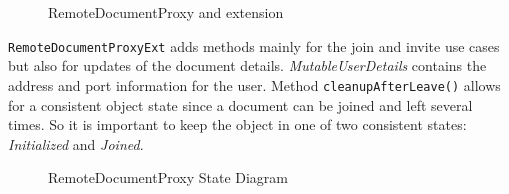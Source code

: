 \begin{figure}[H]
 \centering
 \caption{RemoteDocumentProxy and extension}
 \label{fig:network.discovery.remotedocumentproxy.uml}
\end{figure}

 \texttt{RemoteDocumentProxyExt} adds methods mainly for the join and invite use cases but also for updates of the document details. \emph{MutableUserDetails} contains the address and port information for the user. Method  \texttt{cleanupAfterLeave()} allows for a consistent object state since a document can be joined and left several times. So it is important to keep the object in one of two consistent states: \emph{Initialized} and \emph{Joined}.  

\begin{figure}[H]
 \centering
 \caption{RemoteDocumentProxy State Diagram}
 \label{fig:network.discovery.remotedocumentproxy.state}
\end{figure}

